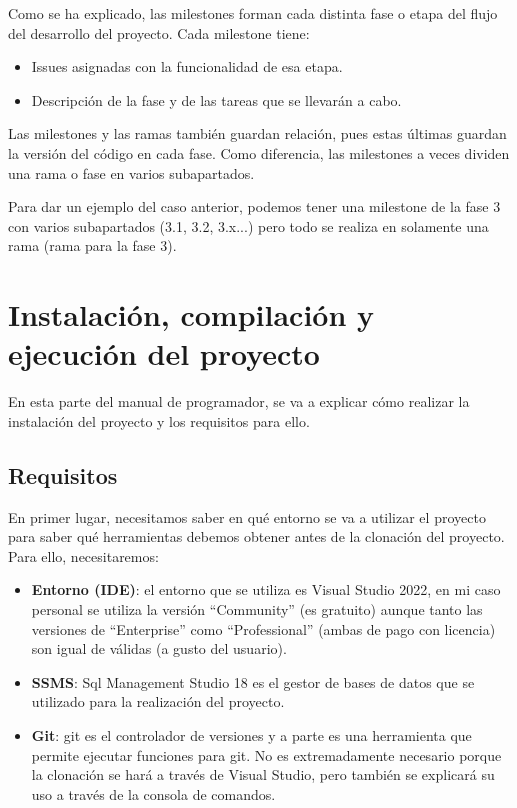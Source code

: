 Como se ha explicado, las milestones forman cada distinta fase o etapa del flujo del desarrollo del proyecto. Cada milestone tiene:
\begin{itemize}
\tightlist
    \item Issues asignadas con la funcionalidad de esa etapa.
    \item Descripción de la fase y de las tareas que se llevarán a cabo.
\end{itemize}

Las milestones y las ramas también guardan relación, pues estas últimas guardan la versión del código en cada fase. Como diferencia, las milestones a veces dividen una rama o fase en varios subapartados.

Para dar un ejemplo del caso anterior, podemos tener una milestone de la fase 3 con varios subapartados (3.1, 3.2, 3.x...) pero todo se realiza en solamente una rama (rama para la fase 3).

\section{Instalación, compilación y ejecución del proyecto}
En esta parte del manual de programador, se va a explicar cómo realizar la instalación del proyecto y los requisitos para ello.

\subsection{Requisitos}
En primer lugar, necesitamos saber en qué entorno se va a utilizar el proyecto para saber qué herramientas debemos obtener antes de la clonación del proyecto. Para ello, necesitaremos:
\begin{itemize}
    \item \textbf{Entorno (IDE)}: el entorno que se utiliza es Visual Studio 2022, en mi caso personal se utiliza la versión ``Community'' (es gratuito) aunque tanto las versiones de ``Enterprise'' como ``Professional'' (ambas de pago con licencia) son igual de válidas 
    (a gusto del usuario).
    \item \textbf{SSMS}: Sql Management Studio 18 es el gestor de bases de datos que se utilizado para la realización del proyecto.
    \item \textbf{Git}: git es el controlador de versiones y a parte es una herramienta que permite ejecutar funciones para git. No es extremadamente necesario porque la clonación se hará a través de Visual Studio, pero también se explicará su uso a través de la consola de comandos.
\end{itemize}

